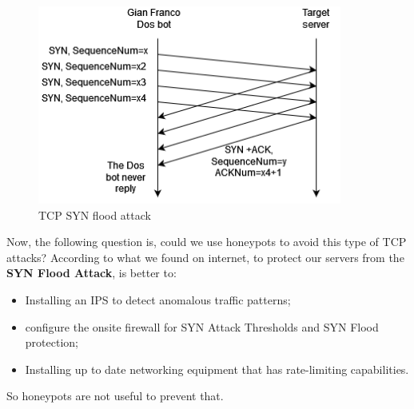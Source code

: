 \begin{figure}[h!]
  \centering
  \includegraphics[width = 10cm]{images/DosSYNFloodAttack.drawio.png}
  \caption{TCP SYN flood attack}
  \label{fig:TCPDos}
\end{figure}
\FloatBarrier
\noindent
Now, the following question is, could we use honeypots to avoid this type of TCP attacks? 
According to what we found on internet, to protect our servers from the \textbf{SYN Flood Attack}, is better to:
\begin{itemize}
  \item Installing an IPS to detect anomalous traffic patterns;
  \item configure the onsite firewall for SYN Attack Thresholds and SYN Flood protection;
  \item Installing up to date networking equipment that has rate-limiting capabilities.
\end{itemize}
So honeypots are not useful to prevent that. 